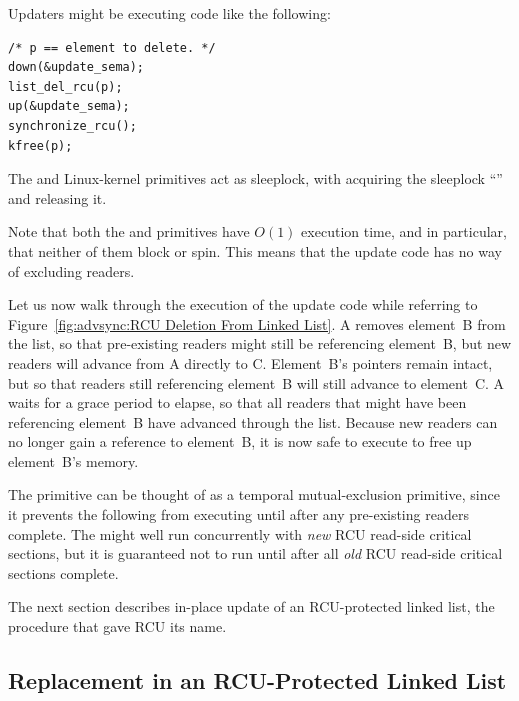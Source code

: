 Updaters might be executing code like the following:

\vspace{5pt}
\begin{minipage}[t]{\columnwidth}
\begin{verbatim}
/* p == element to delete. */
down(&update_sema);
list_del_rcu(p);
up(&update_sema);
synchronize_rcu();
kfree(p);
\end{verbatim}
\end{minipage}
\vspace{5pt}

The  and  Linux-kernel primitives act as sleeplock,
with  acquiring the sleeplock ``''
and  releasing it.

Note that both the  and 
primitives have $O(1)$ execution time, and in particular, that
neither of them block or spin.
This means that the update code has no way of excluding readers.

Let us now walk through the execution of the update code
while referring to
Figure~\ref{fig:advsync:RCU Deletion From Linked List}.
A  removes element~B from the list, so that
pre-existing readers might still be referencing
element~B, but new readers will advance from A directly to C.
Element~B's pointers remain intact, but so that readers still
referencing element~B will still advance to element~C.
A  waits for a grace period to elapse,
so that all readers that might have been referencing element~B have
advanced through the list.
Because new readers can no longer gain a reference to element~B,
it is now safe to execute  to free up element~B's memory.

The  primitive can be thought of as a temporal
mutual-exclusion primitive, since it prevents the following 
from executing until after any pre-existing readers complete.
The  might well run concurrently with \emph{new}
RCU read-side critical sections, but it is guaranteed not to run
until after all \emph{old} RCU read-side critical sections complete.

The next section describes in-place update of an RCU-protected
linked list, the procedure that gave RCU its name.

\subsection{Replacement in an RCU-Protected Linked List}
\label{sec:advsync:Replacement in an RCU-Protected Linked List}

